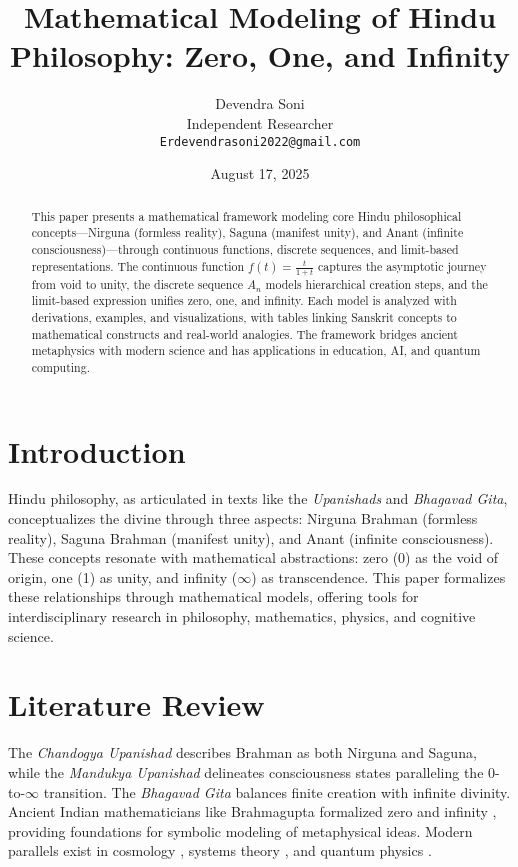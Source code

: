 \documentclass[11pt]{article}
\title{Mathematical Modeling of Hindu Philosophy: Zero, One, and Infinity}
\author{Devendra Soni \\ Independent Researcher \\ \texttt{Erdevendrasoni2022@gmail.com}}
\date{August 17, 2025}
\begin{document}
\maketitle

\begin{abstract}
This paper presents a mathematical framework modeling core Hindu philosophical concepts—Nirguna (formless reality), Saguna (manifest unity), and Anant (infinite consciousness)—through continuous functions, discrete sequences, and limit-based representations. The continuous function \( f(t) = \frac{t}{1+t} \) captures the asymptotic journey from void to unity, the discrete sequence \( A_n \) models hierarchical creation steps, and the limit-based expression unifies zero, one, and infinity. Each model is analyzed with derivations, examples, and visualizations, with tables linking Sanskrit concepts to mathematical constructs and real-world analogies. The framework bridges ancient metaphysics with modern science and has applications in education, AI, and quantum computing.
\end{abstract}

\section{Introduction}
Hindu philosophy, as articulated in texts like the \textit{Upanishads} and \textit{Bhagavad Gita}, conceptualizes the divine through three aspects: Nirguna Brahman (formless reality), Saguna Brahman (manifest unity), and Anant (infinite consciousness). These concepts resonate with mathematical abstractions: zero (0) as the void of origin, one (1) as unity, and infinity (\(\infty\)) as transcendence. This paper formalizes these relationships through mathematical models, offering tools for interdisciplinary research in philosophy, mathematics, physics, and cognitive science.

\section{Literature Review}
The \textit{Chandogya Upanishad} \citep{radhakrishnan1992} describes Brahman as both Nirguna and Saguna, while the \textit{Mandukya Upanishad} \citep{olivelle1998} delineates consciousness states paralleling the 0-to-\(\infty\) transition. The \textit{Bhagavad Gita} \citep{prabhupada1985} balances finite creation with infinite divinity. Ancient Indian mathematicians like Brahmagupta formalized zero and infinity \citep{joseph2000}, providing foundations for symbolic modeling of metaphysical ideas. Modern parallels exist in cosmology \citep{hawking1988}, systems theory \citep{meadows2008}, and quantum physics \citep{despagnat2011}.
\end{document}
